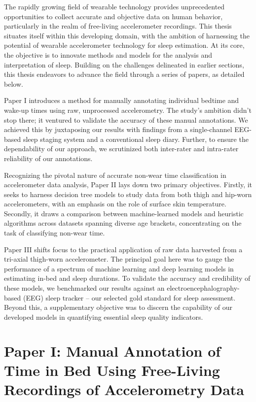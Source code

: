 \documentclass[
  10pt,
]{scrbook}
\begin{document}
The rapidly growing field of wearable technology provides unprecedented
opportunities to collect accurate and objective data on human behavior,
particularly in the realm of free-living accelerometer recordings. This
thesis situates itself within this developing domain, with the ambition
of harnessing the potential of wearable accelerometer technology for
sleep estimation. At its core, the objective is to innovate methods and
models for the analysis and interpretation of sleep. Building on the
challenges delineated in earlier sections, this thesis endeavors to
advance the field through a series of papers, as detailed below.

Paper I introduces a method for manually annotating individual bedtime
and wake-up times using raw, unprocessed accelerometry. The study's
ambition didn't stop there; it ventured to validate the accuracy of
these manual annotations. We achieved this by juxtaposing our results
with findings from a single-channel EEG-based sleep staging system and a
conventional sleep diary. Further, to ensure the dependability of our
approach, we scrutinized both inter-rater and intra-rater reliability of
our annotations.

Recognizing the pivotal nature of accurate non-wear time classification
in accelerometer data analysis, Paper II lays down two primary
objectives. Firstly, it seeks to harness decision tree models to study
data from both thigh and hip-worn accelerometers, with an emphasis on
the role of surface skin temperature. Secondly, it draws a comparison
between machine-learned models and heuristic algorithms across datasets
spanning diverse age brackets, concentrating on the task of classifying
non-wear time.

Paper III shifts focus to the practical application of raw data
harvested from a tri-axial thigh-worn accelerometer. The principal goal
here was to gauge the performance of a spectrum of machine learning and
deep learning models in estimating in-bed and sleep durations. To
validate the accuracy and credibility of these models, we benchmarked
our results against an electroencephalography-based (EEG) sleep tracker
-- our selected gold standard for sleep assessment. Beyond this, a
supplementary objective was to discern the capability of our developed
models in quantifying essential sleep quality indicators.

\hypertarget{paper-i-manual-annotation-of-time-in-bed-using-free-living-recordings-of-accelerometry-data}{%
\chapter{Paper I: Manual Annotation of Time in Bed Using Free-Living
Recordings of Accelerometry
Data}\label{paper-i-manual-annotation-of-time-in-bed-using-free-living-recordings-of-accelerometry-data}}
\end{document}
